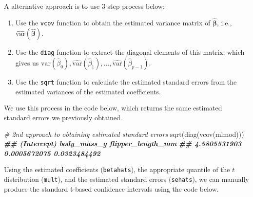\documentclass[
]{book}
\newenvironment{Shaded}{\begin{snugshade}}{\end{snugshade}}
\newcommand{\CommentTok}[1]{\textcolor[rgb]{0.56,0.35,0.01}{\textit{#1}}}
\newcommand{\DecValTok}[1]{\textcolor[rgb]{0.00,0.00,0.81}{#1}}
\newcommand{\DocumentationTok}[1]{\textcolor[rgb]{0.56,0.35,0.01}{\textbf{\textit{#1}}}}
\newcommand{\FunctionTok}[1]{\textcolor[rgb]{0.00,0.00,0.00}{#1}}
\newcommand{\NormalTok}[1]{#1}
\newcommand{\OtherTok}[1]{\textcolor[rgb]{0.56,0.35,0.01}{#1}}
\newcommand{\SpecialCharTok}[1]{\textcolor[rgb]{0.00,0.00,0.00}{#1}}
\providecommand{\tightlist}{%
  \setlength{\itemsep}{0pt}\setlength{\parskip}{0pt}}
\theoremstyle{definition}
\theoremstyle{definition}
\theoremstyle{definition}
\theoremstyle{definition}
\theoremstyle{remark}
\begin{document}
\begin{Shaded}
\end{Shaded}

A alternative approach is to use 3 step process below:

\begin{enumerate}
\def\labelenumi{\arabic{enumi}.}
\tightlist
\item
  Use the \texttt{vcov} function to obtain the estimated variance matrix of
  \(\hat{\boldsymbol{\beta}}\), i.e.,
  \(\hat{\mathrm{var}}(\hat{\boldsymbol{\beta}})\).
\item
  Use the \texttt{diag} function to extract the diagonal elements of this
  matrix, which gives us
  \(\hat{\mathrm{var}}(\hat{\beta}_0), \hat{\mathrm{var}}(\hat{\beta}_1), \ldots, \hat{\mathrm{var}}(\hat{\beta}_{p-1})\).
\item
  Use the \texttt{sqrt} function to calculate the estimated standard errors
  from the estimated variances of the estimated coefficients.
\end{enumerate}

We use this process in the code below, which returns the same estimated
standard errors we previously obtained.

\begin{Shaded}
\begin{Highlighting}[]
\CommentTok{\# 2nd approach to obtaining estimated standard errors}
\FunctionTok{sqrt}\NormalTok{(}\FunctionTok{diag}\NormalTok{(}\FunctionTok{vcov}\NormalTok{(mlmod)))}
\DocumentationTok{\#\#       (Intercept)       body\_mass\_g flipper\_length\_mm }
\DocumentationTok{\#\#      4.5805531903      0.0005672075      0.0323484492}
\end{Highlighting}
\end{Shaded}

Using the estimated coefficients (\texttt{betahats}), the appropriate quantile of the \(t\) distribution (\texttt{mult}), and the estimated standard errors (\texttt{sehats}), we can manually produce the standard t-based confidence intervals using the code below.
\end{document}

